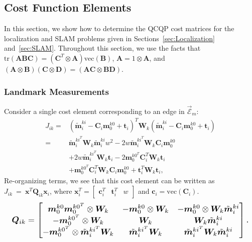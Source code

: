 \documentclass[lettersize,journal]{IEEEtran}
\newcommand{\EdgeSet}{\vec{\bm{\mathcal{E}}}}
\newcommand{\vect}[1]{\mbox{vec}(#1)}
\newcommand{\tr}[1]{\mbox{tr}\left(#1\right)}
\begin{document}
\subsection{Cost Function Elements}\label{App:LocCost}

In this section, we show how to determine the QCQP cost matrices for the localization and SLAM problems given in Sections~\ref{sec:Localization} and~\ref{sec:SLAM}. Throughout this section, we use the facts that $ \tr{\bm{A}\bm{B}\bm{C}} = (\bm{C}^T\otimes\bm{A}) \vect{\bm{B}}$, $ \bm{A} = 1\otimes\bm{A} $, and $ (\bm{A}\otimes\bm{B})(\bm{C}\otimes\bm{D}) = (\bm{AC}\otimes\bm{BD}) $\cite{magnusMatrixDifferentialCalculus2019}. 


\subsubsection{Landmark Measurements}

Consider a single cost element corresponding to an edge in $\EdgeSet_m $:
\begin{align*}
	J_{ik}=&(\tilde{\bm{m}}_i^{ki} - \bm{C}_i\bm{m}_0^{k0} + \bm{t}_i)^T \bm{W}_k (\tilde{\bm{m}}_i^{ki} - \bm{C}_i\bm{m}_0^{k0} + \bm{t}_i) \\
	=& \tilde{\bm{m}}_i^{ki^T}\bm{W}_k\tilde{\bm{m}}_i^{ki} w^2 - 2 w\tilde{\bm{m}}_i^{ki^T}\bm{W}_k\bm{C}_i\bm{m}_0^{k0}  \\
	&+ 2 w\tilde{\bm{m}}_i^{ki^T}\bm{W}_k\bm{t}_i -2\bm{m}_0^{k0^T}\bm{C}_i^T\bm{W}_k\bm{t}_i\\
	& + \bm{m}_0^{k0^T}\bm{C}_i^T\bm{W}_k\bm{C}_i\bm{m}_0^{k0} + \bm{t}_i^T\bm{W}_k\bm{t}_i,
\end{align*}
Re-organizing terms, we see that this cost element can be written as $J_{ik}~=~\bm{x}^T\bm{Q}_{ik}\bm{x}_i$, where $ \bm{x}_i^T = \begin{bmatrix} \bm{c}_i^T &  \bm{t}_i^T & w \end{bmatrix} $ and $ \bm{c}_i=\vect{\bm{C}_i} $.
\begin{equation*}
	\resizebox{0.98\columnwidth}{!}{$\bm{Q}_{ik}=\begin{bmatrix}
			\bm{m}_0^{k0}\bm{m}_0^{k0^T} \otimes \bm{W}_k  & -\bm{m}_0^{k0}\otimes\bm{W}_k & -\bm{m}_0^{k0}\otimes\bm{W}_k\tilde{\bm{m}}_i^{ki}\\
			 -\bm{m}_0^{k0^T}\otimes\bm{W}_k & \bm{W}_k & \bm{W}_k\tilde{\bm{m}}_i^{ki} \\
			-\bm{m}_0^{k0^T}\otimes\tilde{\bm{m}}_i^{ki^T}\bm{W}_k & \tilde{\bm{m}}_i^{ki^T}\bm{W}_k & \tilde{\bm{m}}_i^{ki^T}\bm{W}_k\tilde{\bm{m}}_i^{ki}
		\end{bmatrix}.$}
\end{equation*}
\end{document}
